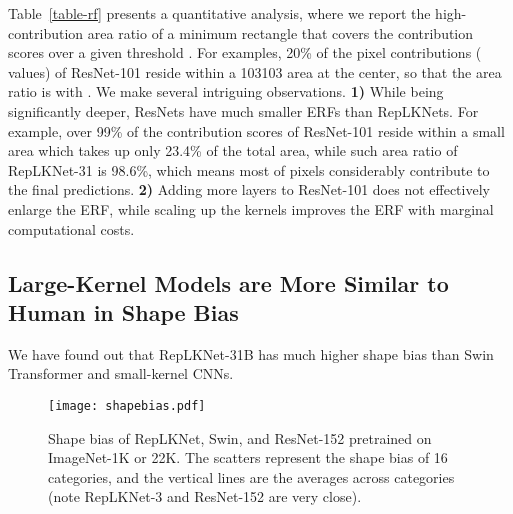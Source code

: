 \documentclass[10pt,twocolumn,letterpaper]{article}
\begin{document}
	Table~\ref{table-rf} presents a quantitative analysis, where we report the high-contribution area ratio  of a minimum rectangle that covers the contribution scores over a given threshold . For examples, 20\% of the pixel contributions ( values) of ResNet-101 reside within a 103103 area at the center, so that the area ratio is  with . We make several intriguing observations. \textbf{1)} While being significantly deeper, ResNets have much smaller ERFs than RepLKNets. For example, over 99\% of the contribution scores of ResNet-101 reside within a small area which takes up only 23.4\% of the total area, while such area ratio of RepLKNet-31 is 98.6\%, which means most of pixels considerably contribute to the final predictions. \textbf{2)} Adding more layers to ResNet-101 does not effectively enlarge the ERF, while scaling up the kernels improves the ERF with marginal computational costs.
	

	
	\subsection{Large-Kernel Models are More Similar to Human in Shape Bias}
	
	We have found out that RepLKNet-31B has much higher shape bias than Swin Transformer and small-kernel CNNs.
	
	\begin{figure}[t]
		\begin{center}
			\texttt{[image: shapebias.pdf]}
			\vspace{-0.25in}
			\caption{Shape bias of RepLKNet, Swin, and ResNet-152 pretrained on ImageNet-1K or 22K. The scatters represent the shape bias of 16 categories, and the vertical lines are the averages across categories (note RepLKNet-3 and ResNet-152 are very close).}
			\label{fig-shapebias}
			\vspace{-0.25in}
		\end{center}
	\end{figure}
	
\end{document}
